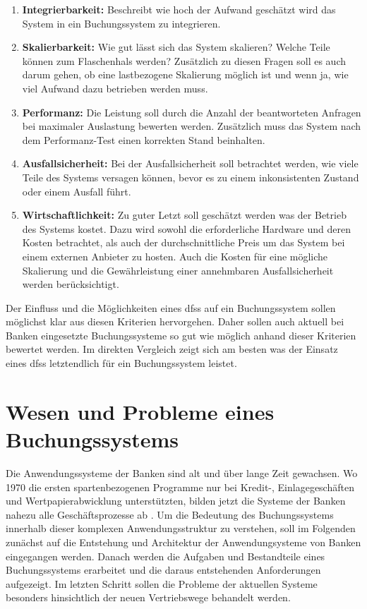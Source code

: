 \documentclass[12pt,oneside,a4paper,parskip]{scrbook}
\begin{document}
\begin{enumerate}
  \item \textbf{Integrierbarkeit:} Beschreibt wie hoch der Aufwand geschätzt wird das System in ein Buchungssystem zu integrieren.
  \item \textbf{Skalierbarkeit:} Wie gut lässt sich das System skalieren? Welche Teile können zum Flaschenhals werden? Zusätzlich zu diesen Fragen soll es auch darum gehen, ob eine lastbezogene Skalierung möglich ist und wenn ja, wie viel Aufwand dazu betrieben werden muss.
  \item \textbf{Performanz:} Die Leistung soll durch die Anzahl der beantworteten Anfragen bei maximaler Auslastung bewerten werden. Zusätzlich muss das System nach dem Performanz-Test einen korrekten Stand beinhalten.
  \item \textbf{Ausfallsicherheit:} Bei der Ausfallsicherheit soll betrachtet werden, wie viele Teile des Systems versagen können, bevor es zu einem inkonsistenten Zustand oder einem Ausfall führt.
  \item \textbf{Wirtschaftlichkeit:} Zu guter Letzt soll geschätzt werden was der Betrieb des Systems kostet. Dazu wird sowohl die erforderliche Hardware und deren Kosten betrachtet, als auch der durchschnittliche Preis um das System bei einem externen Anbieter zu hosten. Auch die Kosten für eine mögliche Skalierung und die Gewährleistung einer annehmbaren Ausfallsicherheit werden berücksichtigt.
\end{enumerate}

Der Einfluss und die Möglichkeiten eines \acp{dfs} auf ein Buchungssystem sollen möglichst klar aus diesen Kriterien hervorgehen.
Daher sollen auch aktuell bei Banken eingesetzte Buchungssysteme so gut wie möglich anhand dieser Kriterien bewertet werden. Im direkten Vergleich zeigt sich am besten was der Einsatz eines \acp{dfs} letztendlich für ein Buchungssystem leistet.

\chapter{Wesen und Probleme eines Buchungssystems}
\label{bookingSystem}
Die Anwendungssysteme der Banken sind alt und über lange Zeit gewachsen. Wo 1970 die ersten spartenbezogenen Programme nur bei Kredit-, Einlagegeschäften und
Wertpapierabwicklung unterstützten, bilden jetzt die Systeme der Banken nahezu alle Geschäftsprozesse ab \cite[16]{ITidF}. Um die Bedeutung des Buchungssystems innerhalb dieser komplexen Anwendungsstruktur zu verstehen, soll im Folgenden zunächst auf die Entstehung und Architektur der Anwendungsysteme von Banken eingegangen werden. Danach werden die Aufgaben und Bestandteile eines Buchungssystems erarbeitet und die daraus entstehenden Anforderungen aufgezeigt. Im letzten Schritt sollen die Probleme der aktuellen Systeme besonders hinsichtlich der neuen Vertriebswege behandelt werden. 
\label{buchungssystem}
\end{document}
